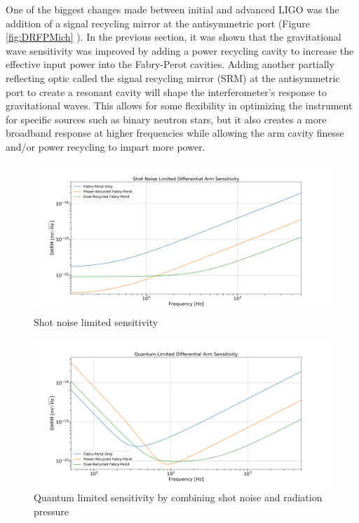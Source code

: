 		One of the biggest changes made between initial and advanced LIGO was the addition of a signal recycling mirror at the antisymmetric port (Figure \ref{fig:DRFPMich} ). In the previous section, it was shown that the gravitational wave sensitivity was improved by adding a power recycling cavity to increase the effective input power into the Fabry-Perot cavities.  Adding another partially reflecting optic called the signal recycling mirror (SRM) at the antisymmetric port to create a resonant cavity will shape the interferometer's response to gravitational waves.  This allows for some flexibility in optimizing the instrument for specific sources such as binary neutron stars, but it also creates a more broadband response at higher frequencies while allowing the arm cavity finesse and/or power recycling to impart more power.
		
		\begin{figure}[ht]
			\centering
			\includegraphics[width=1.0 \textwidth]{../Figures/SN_Lim_Sense.png}
			\caption{Shot noise limited sensitivity}
			\label{fig:SN_sense}
		\end{figure}
		
		\begin{figure}[ht]
			\centering
			\includegraphics[width=1.0 \textwidth]{../Figures/QM_Limited_Sense.png}
			\caption{Quantum limited sensitivity by combining shot noise and radiation pressure}
			\label{fig:DRMICH_sense}
		\end{figure}
		
